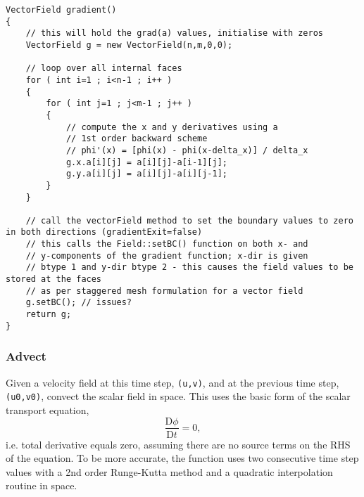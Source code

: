 \documentclass[notitlepage]{article}
\begin{document}
\begin{lstlisting}[style=myCpp]
VectorField gradient()
{
	// this will hold the grad(a) values, initialise with zeros
	VectorField g = new VectorField(n,m,0,0);
	
	// loop over all internal faces
	for ( int i=1 ; i<n-1 ; i++ )
	{
		for ( int j=1 ; j<m-1 ; j++ )
		{
			// compute the x and y derivatives using a
			// 1st order backward scheme
			// phi'(x) = [phi(x) - phi(x-delta_x)] / delta_x
			g.x.a[i][j] = a[i][j]-a[i-1][j];
			g.y.a[i][j] = a[i][j]-a[i][j-1];
		}
	}
	
	// call the vectorField method to set the boundary values to zero in both directions (gradientExit=false)
	// this calls the Field::setBC() function on both x- and
	// y-components of the gradient function; x-dir is given
	// btype 1 and y-dir btype 2 - this causes the field values to be stored at the faces
	// as per staggered mesh formulation for a vector field
	g.setBC(); // issues?
	return g;
}
\end{lstlisting}

\subsubsection{Advect}

Given a velocity field at this time step, \texttt{(u,v)}, and at the previous time step,
\texttt{(u0,v0)}, convect the scalar field in space. This uses the basic form of the scalar
transport equation,
%
\begin{equation}
\frac{\mathrm{D} \phi}{\mathrm{D}t} = 0,
\end{equation}
%
i.e. total derivative equals zero, assuming there are no
source terms on the RHS of the equation. To be more accurate, the function uses
two consecutive time step values with a 2nd order Runge-Kutta method and a
quadratic interpolation routine in space.
\end{document}
